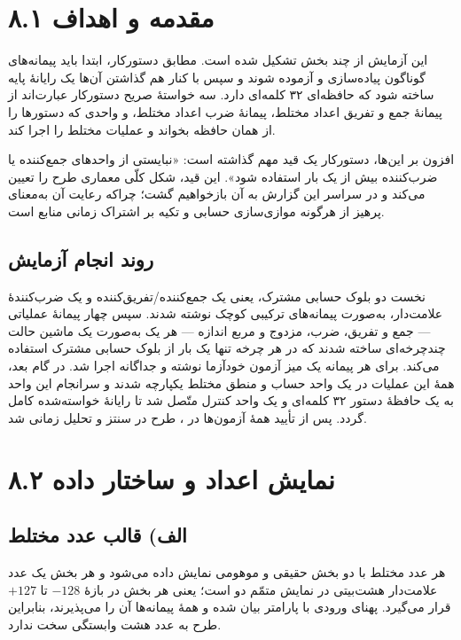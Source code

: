 \documentclass[12pt,a4paper]{article}
\begin{document}

	\section*{۸.۱ مقدمه و اهداف}
	این آزمایش از چند بخش تشکیل شده است. مطابق دستورکار، ابتدا باید پیمانه‌های گوناگون پیاده‌سازی و آزموده شوند و سپس با کنار هم گذاشتن آن‌ها یک رایانهٔ پایه ساخته شود که حافظه‌ای ۳۲ کلمه‌ای دارد. سه خواستهٔ صریح دستورکار عبارت‌اند از پیمانهٔ جمع و تفریق اعداد مختلط، پیمانهٔ ضرب اعداد مختلط، و واحدی که دستورها را از همان حافظه بخواند و عملیات مختلط را اجرا کند.

	افزون بر این‌ها، دستورکار یک قید مهم گذاشته است: «نبایستی از واحدهای جمع‌کننده یا ضرب‌کننده بیش از یک بار استفاده شود». این قید، شکل کلّی معماری طرح را تعیین می‌کند و در سراسر این گزارش به آن بازخواهیم گشت؛ چراکه رعایت آن به‌معنای پرهیز از هرگونه موازی‌سازی حسابی و تکیه بر اشتراک زمانی منابع است.

	\subsection*{روند انجام آزمایش}
	نخست دو بلوک حسابی مشترک، یعنی یک جمع‌کننده/تفریق‌کننده و یک ضرب‌کنندهٔ علامت‌دار، به‌صورت پیمانه‌های ترکیبی کوچک نوشته شدند. سپس چهار پیمانهٔ عملیاتی --- جمع و تفریق، ضرب، مزدوج و مربع اندازه --- هر یک به‌صورت یک ماشین حالت چندچرخه‌ای ساخته شدند که در هر چرخه تنها یک بار از بلوک حسابی مشترک استفاده می‌کند. برای هر پیمانه یک میز آزمون خودآزما نوشته و جداگانه اجرا شد. در گام بعد، همهٔ این عملیات در یک واحد حساب و منطق مختلط یکپارچه شدند و سرانجام این واحد به یک حافظهٔ دستور ۳۲ کلمه‌ای و یک واحد کنترل متّصل شد تا رایانهٔ خواسته‌شده کامل گردد. پس از تأیید همهٔ آزمون‌ها در ، طرح در  سنتز و تحلیل زمانی شد.

	\section*{۸.۲ نمایش اعداد و ساختار داده}
	\subsection*{الف) قالب عدد مختلط}
	هر عدد مختلط با دو بخش حقیقی و موهومی نمایش داده می‌شود و هر بخش یک عدد علامت‌دار هشت‌بیتی در نمایش متمّم دو است؛ یعنی هر بخش در بازهٔ \(-128\) تا \(+127\) قرار می‌گیرد. پهنای ورودی با پارامتر  بیان شده و همهٔ پیمانه‌ها آن را می‌پذیرند، بنابراین طرح به عدد هشت وابستگی سخت ندارد.
\end{document}
